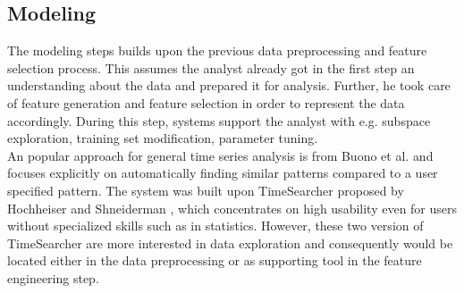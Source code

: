 \documentclass[electronic]{vgtc}             %
\begin{document}
\subsection{Modeling\label{sec:modeling}}
The modeling steps builds upon the previous data preprocessing and feature selection process. 
This assumes the analyst already got in the first step an understanding about the data and prepared it for analysis.
Further, he took care of feature generation and feature selection in order to represent the data accordingly. 
During this step, systems support the analyst with e.g. subspace exploration, training set modification, parameter tuning. \cite{Lu:2017}\\
An popular approach for general time series analysis is from Buono et al. \cite{buono:2005} and focuses explicitly on automatically finding similar patterns compared to a user specified pattern.
The system was built upon TimeSearcher proposed by Hochheiser and Shneiderman \cite{Hochheiser:2004}, which concentrates on high usability even for users without specialized skills such as in statistics.
However, these two version of TimeSearcher are more interested in data exploration and consequently would be located either in the data preprocessing or as supporting tool in the feature engineering step. 
\end{document}
